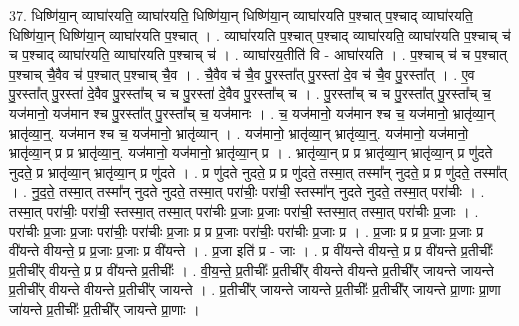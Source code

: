 \documentclass[17pt]{extarticle}
\begin{document}
37. धिष्णि॑या॒न् व्याघा॑रयति॒ व्याघा॑रयति॒ धिष्णि॑या॒न् धिष्णि॑या॒न् व्याघा॑रयति प॒श्चात् प॒श्चाद् व्याघा॑रयति॒ धिष्णि॑या॒न् धिष्णि॑या॒न् व्याघा॑रयति प॒श्चात् । . व्याघा॑रयति प॒श्चात् प॒श्चाद् व्याघा॑रयति॒ व्याघा॑रयति प॒श्चाच् च॑ च प॒श्चाद् व्याघा॑रयति॒ व्याघा॑रयति प॒श्चाच् च॑ । . व्याघा॑रय॒तीति॑ वि - आघा॑रयति । . प॒श्चाच् च॑ च प॒श्चात् प॒श्चाच् चै॒वैव च॑ प॒श्चात् प॒श्चाच् चै॒व । . चै॒वैव च॑ चै॒व पु॒रस्ता᳚त् पु॒रस्ता॑ दे॒व च॑ चै॒व पु॒रस्ता᳚त् । . ए॒व पु॒रस्ता᳚त् पु॒रस्ता॑ दे॒वैव पु॒रस्ता᳚च् च च पु॒रस्ता॑ दे॒वैव पु॒रस्ता᳚च् च । . पु॒रस्ता᳚च् च च पु॒रस्ता᳚त् पु॒रस्ता᳚च् च॒ यज॑मानो॒ यज॑मान श्च पु॒रस्ता᳚त् पु॒रस्ता᳚च् च॒ यज॑मानः । . च॒ यज॑मानो॒ यज॑मान श्च च॒ यज॑मानो॒ भ्रातृ॑व्या॒न् भ्रातृ॑व्या॒न्॒. यज॑मान श्च च॒ यज॑मानो॒ भ्रातृ॑व्यान् । . यज॑मानो॒ भ्रातृ॑व्या॒न् भ्रातृ॑व्या॒न्॒. यज॑मानो॒ यज॑मानो॒ भ्रातृ॑व्या॒न् प्र प्र भ्रातृ॑व्या॒न्॒. यज॑मानो॒ यज॑मानो॒ भ्रातृ॑व्या॒न् प्र । . भ्रातृ॑व्या॒न् प्र प्र भ्रातृ॑व्या॒न् भ्रातृ॑व्या॒न् प्र णु॑दते नुदते॒ प्र भ्रातृ॑व्या॒न् भ्रातृ॑व्या॒न् प्र णु॑दते । . प्र णु॑दते नुदते॒ प्र प्र णु॑दते॒ तस्मा॒त् तस्मा᳚न् नुदते॒ प्र प्र णु॑दते॒ तस्मा᳚त् । . नु॒द॒ते॒ तस्मा॒त् तस्मा᳚न् नुदते नुदते॒ तस्मा॒त् परा॑चीः॒ परा॑ची॒ स्तस्मा᳚न् नुदते नुदते॒ तस्मा॒त् परा॑चीः । . तस्मा॒त् परा॑चीः॒ परा॑ची॒ स्तस्मा॒त् तस्मा॒त् परा॑चीः प्र॒जाः प्र॒जाः परा॑ची॒ स्तस्मा॒त् तस्मा॒त् परा॑चीः प्र॒जाः । . परा॑चीः प्र॒जाः प्र॒जाः परा॑चीः॒ परा॑चीः प्र॒जाः प्र प्र प्र॒जाः परा॑चीः॒ परा॑चीः प्र॒जाः प्र । . प्र॒जाः प्र प्र प्र॒जाः प्र॒जाः प्र वी॑यन्ते वीयन्ते॒ प्र प्र॒जाः प्र॒जाः प्र वी॑यन्ते । . प्र॒जा इति॑ प्र - जाः । . प्र वी॑यन्ते वीयन्ते॒ प्र प्र वी॑यन्ते प्र॒तीचीः᳚ प्र॒तीची᳚र् वीयन्ते॒ प्र प्र वी॑यन्ते प्र॒तीचीः᳚ । . वी॒य॒न्ते॒ प्र॒तीचीः᳚ प्र॒तीची᳚र् वीयन्ते वीयन्ते प्र॒तीची᳚र् जायन्ते जायन्ते प्र॒तीची᳚र् वीयन्ते वीयन्ते प्र॒तीची᳚र् जायन्ते । . प्र॒तीची᳚र् जायन्ते जायन्ते प्र॒तीचीः᳚ प्र॒तीची᳚र् जायन्ते प्रा॒णाः प्रा॒णा जा॑यन्ते प्र॒तीचीः᳚ प्र॒तीची᳚र् जायन्ते प्रा॒णाः । \newline
\pagebreak
{}
\end{document}
